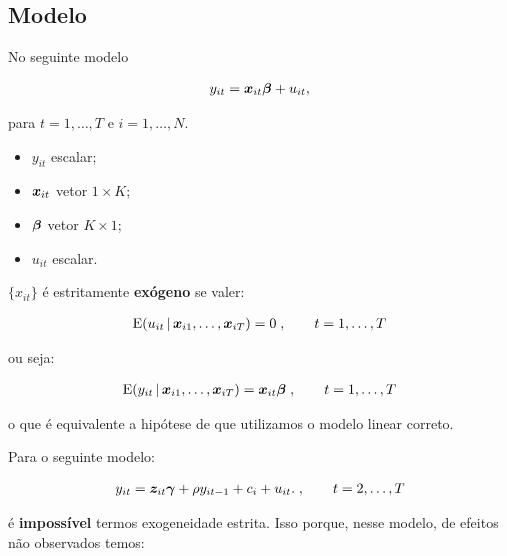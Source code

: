 \documentclass[11pt, oneside, a4paper, article]{article}
\numberwithin{equation}{section}
\begin{document}
\begin{description}
\subsection{Modelo}

No seguinte modelo

\vspace{-1 em}
\begin{align*} 
	y_{it} = \boldsymbol{x}_{it} \boldsymbol{\beta} + u_{it},
\end{align*}

\noindent
para
$t = 1, \dots, T$ e $i = 1, \dots, N$.

\begin{itemize}\itemsep0pt
\item
$y_{it}$ escalar;

\item
$\boldsymbol{x}_{it}$  vetor $1 \times K$;

\item
$\boldsymbol{\beta}$ vetor $K \times 1$;

\item
$u_{it}$ escalar.
\end{itemize}

\noindent
$\{x_{it}\}$ é estritamente \textbf{exógeno} se valer:

\vspace{-1 em}
\begin{align*}
	\text{E}( u_{it} \, | \, \boldsymbol{x}_{i1}, \dots, \boldsymbol{x}_{iT} ) = 0 \; , \qquad t = 1, \dots, T
\end{align*}

\noindent
ou seja:

\vspace{-1 em}
\begin{align*}
\text{E}( y_{it} \, | \, \boldsymbol{x}_{i1}, \dots, \boldsymbol{x}_{iT} ) = \boldsymbol{x}_{it} \boldsymbol{\beta} 
\; , \qquad t = 1, \dots, T
\end{align*}

\noindent
o que é equivalente a hipótese de que utilizamos o modelo linear correto.

Para o seguinte modelo:

\vspace{-1.5 em}
\begin{align*}
y_{it} = \boldsymbol{z}_{it} \boldsymbol{\gamma} + \rho y_{i t - 1} + c_{i} + u_{it}.
\; , \qquad t = 2, \dots, T
\end{align*}

\noindent
é \textbf{impossível} termos exogeneidade estrita.
Isso porque, nesse modelo, de efeitos não observados temos:


\end{description}
\end{document}
